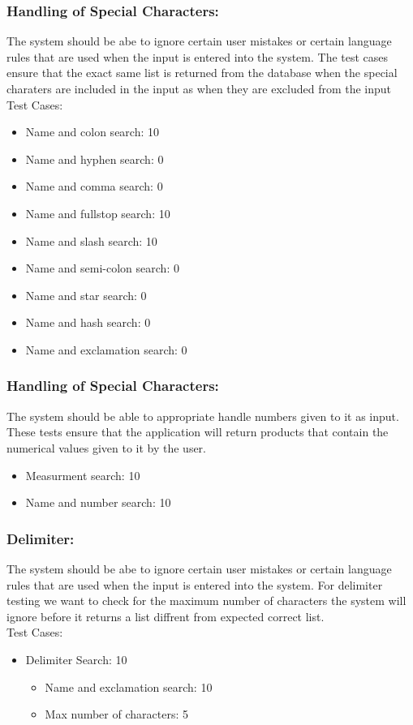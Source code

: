 \documentclass[11pt]{article}
\begin{document}
	\subsubsection{Handling of Special Characters: }
	The system should be abe to ignore certain user mistakes or certain language rules that are used when the input is entered into the system. The test cases ensure that the exact same list is returned from the database when the special charaters are included in the input as when they are excluded from the input\\
	Test Cases:
	 \begin{itemize}
	 \item Name and colon search: 10
         \item Name and hyphen search: 0
         \item Name and comma search: 0
         \item Name and fullstop search: 10 
         \item Name and slash search: 10
         \item Name and semi-colon search: 0
         \item Name and star search: 0
         \item Name and hash search: 0
         \item Name and exclamation search: 0
        \end{itemize}

	\subsubsection{Handling of Special Characters: }
	The system should be able to appropriate handle numbers given to it as input. These tests ensure that the application will return products that contain the numerical values given to it by the user.
	\begin{itemize}
	\item Measurment search: 10
	\item Name and number search: 10
        \end{itemize}

	\subsubsection{Delimiter: }
	The system should be abe to ignore certain user mistakes or certain language rules that are used when the input is entered into the system. For delimiter testing we want to check for the maximum number of characters the system will ignore before it returns a list diffrent from expected correct list.\\
	Test Cases:
	 \begin{itemize}
	 \item Delimiter Search: 10
		 \begin{itemize}
         	 \item Name and exclamation search: 10
        	 \item Max number of characters: 5
        	 \end{itemize}
        \end{itemize}
	
\end{document}
